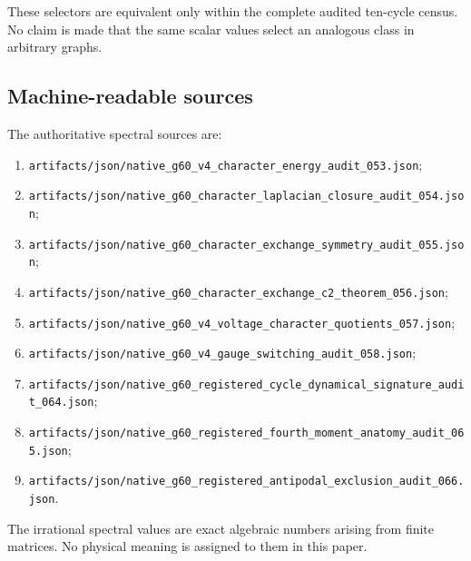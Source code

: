 These selectors are equivalent only within the complete audited
ten-cycle census. No claim is made that the same scalar values select
an analogous class in arbitrary graphs.

\subsection{Machine-readable sources}

The authoritative spectral sources are:

\begin{enumerate}
    \item
    \texttt{artifacts/json/native\_g60\_v4\_character\_energy\_audit\_053.json};

    \item
    \texttt{artifacts/json/native\_g60\_character\_laplacian\_closure\_audit\_054.json};

    \item
    \texttt{artifacts/json/native\_g60\_character\_exchange\_symmetry\_audit\_055.json};

    \item
    \texttt{artifacts/json/native\_g60\_character\_exchange\_c2\_theorem\_056.json};

    \item
    \texttt{artifacts/json/native\_g60\_v4\_voltage\_character\_quotients\_057.json};

    \item
    \texttt{artifacts/json/native\_g60\_v4\_gauge\_switching\_audit\_058.json};

    \item
    \texttt{artifacts/json/native\_g60\_registered\_cycle\_dynamical\_signature\_audit\_064.json};

    \item
    \texttt{artifacts/json/native\_g60\_registered\_fourth\_moment\_anatomy\_audit\_065.json};

    \item
    \texttt{artifacts/json/native\_g60\_registered\_antipodal\_exclusion\_audit\_066.json}.
\end{enumerate}

The irrational spectral values are exact algebraic numbers arising
from finite matrices. No physical meaning is assigned to them in this
paper.
